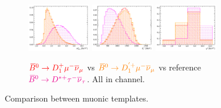\begin{figure}[!htb]
    \begin{subfigure}{\textwidth}
        \centering
        \includegraphics[width=0.3\textwidth]{figs-fit-fit-templates/histo-comp/Dst_iso_DstTau__vs__Dst_iso_D1ststMu__vs__Dst_iso_D1pststMu__m2miss.pdf}
        \includegraphics[width=0.3\textwidth]{figs-fit-fit-templates/histo-comp/Dst_iso_DstTau__vs__Dst_iso_D1ststMu__vs__Dst_iso_D1pststMu__el.pdf}
        \includegraphics[width=0.3\textwidth]{figs-fit-fit-templates/histo-comp/Dst_iso_DstTau__vs__Dst_iso_D1ststMu__vs__Dst_iso_D1pststMu__q2.pdf}
        \caption{
            $\textcolor{red}{{{\kern 0.18em\overline{\kern -0.18em B}}{}^0} \rightarrow {\ensuremath{D}}_1^+{\mu^-}{{\overline{\nu}}_\mu}}$
            vs
            $\textcolor{orange}{{{\kern 0.18em\overline{\kern -0.18em B}}{}^0} \rightarrow {\ensuremath{D}}_1^{'+} {\mu^-}{{\overline{\nu}}_\mu}}$
            vs reference
            $\textcolor{magenta}{{{\kern 0.18em\overline{\kern -0.18em B}}{}^0} \rightarrow {\ensuremath{{D}^{*+}}}{\ensuremath{\tau^-}}{\ensuremath{{\overline{\nu}}_\tau}}}$.
            All in \Dstar channel.
        }
    \end{subfigure}

    \caption{Comparison between muonic \Dstst templates.}
    \label{fig:dstst-mu}
\end{figure}

%
